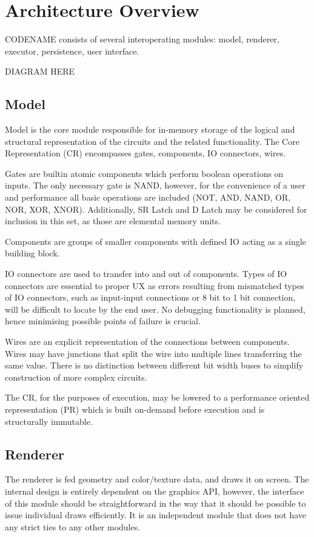 \documentclass[12pt, a4paper]{article}
\begin{document}
\section{Architecture Overview}
CODENAME consists of several interoperating modules: model, renderer, executor, persistence, user
interface.

DIAGRAM HERE

\subsection{Model}
Model is the core module responsible for in-memory storage of the logical and structural
representation of the circuits and the related functionality. The Core Representation (CR)
encompasses gates, components, IO connectors, wires.

Gates are builtin atomic components which perform boolean operations on inputs. The only necessary
gate is NAND, however, for the convenience of a user and performance all basic operations are
included (NOT, AND, NAND, OR, NOR, XOR, XNOR). Additionally, SR Latch and D Latch may be considered
for inclusion in this set, as those are elemental memory units.

Components are groups of smaller components with defined IO acting as a single building block.

IO connectors are used to transfer into and out of components. Types of IO connectors are essential
to proper UX as errors resulting from mismatched types of IO connectors, such as input-input
connections or 8 bit to 1 bit connection, will be difficult to locate by the end user. No debugging
functionality is planned, hence minimising possible points of failure is crucial.

Wires are an explicit representation of the connections between components. Wires may have junctions
that split the wire into multiple lines transferring the same value. There is no distinction between
different bit width buses to simplify construction of more complex circuits.

The CR, for the purposes of execution, may be lowered to a performance oriented representation (PR)
which is built on-demand before execution and is structurally immutable.

\subsection{Renderer}
The renderer is fed geometry and color/texture data, and draws it on screen. The internal design is
entirely dependent on the graphics API, however, the interface of this module should be
straightforward in the way that it should be possible to issue individual draws efficiently. It is
an independent module that does not have any strict ties to any other modules.
\end{document}
